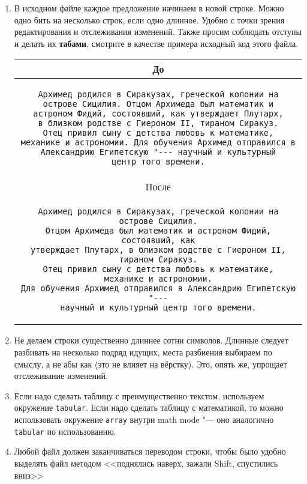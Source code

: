 \begin{enumerate}
\item
	В исходном файле каждое предложение начинаем в новой строке.
	Можно одно бить на несколько строк, если одно длинное.
	Удобно с точки зрения редактирования и отслеживания изменений.
	Также просим соблюдать отступы и делать их \textbf{табами}, смотрите в качестве примера исходный код этого файла.

	\begin{center}\begin{tabular}{|c|}
	\hline
	До \\
	\hline
	\begin{minipage}{0.9\textwidth}
\begin{verbatim}
Архимед родился в Сиракузах, греческой колонии на
острове Сицилия. Отцом Архимеда был математик и
астроном Фидий, состоявший, как утверждает Плутарх,
в близком родстве с Гиероном II, тираном Сиракуз.
Отец привил сыну с детства любовь к математике,
механике и астрономии. Для обучения Архимед отправился в
Александрию Египетскую "--- научный и культурный
центр того времени.
\end{verbatim}
	\end{minipage}
	\\
	\hline После \\
	\hline
	\begin{minipage}{0.9\textwidth}
\begin{verbatim}
Архимед родился в Сиракузах, греческой колонии на острове Сицилия.
Отцом Архимеда был математик и астроном Фидий, состоявший, как
утверждает Плутарх, в близком родстве с Гиероном II, тираном Сиракуз.
Отец привил сыну с детства любовь к математике,
механике и астрономии.
Для обучения Архимед отправился в Александрию Египетскую "---
научный и культурный центр того времени.
\end{verbatim}
	\end{minipage} \\
	\hline
	\end{tabular}\end{center}

\item
	Не делаем строки существенно длиннее сотни символов.
	Длинные следует разбивать на несколько подряд идущих, места разбиения выбираем по смыслу, а не абы как (это не влияет на вёрстку).
	Это, опять же, упрощает отслеживание изменений.

\item
	Если надо сделать таблицу с преимущественно текстом, используем окружение \texttt{tabular}.
	Если надо сделать таблицу с математикой, то можно использовать окружение \texttt{array}
	внутри math mode "--- оно аналогично \texttt{tabular} по использованию.

\item
	Любой файл должен заканчиваться переводом строки, чтобы было удобно выделять файл
	методом <<поднялись наверх, зажали Shift, спустились вниз>>

\end{enumerate}

